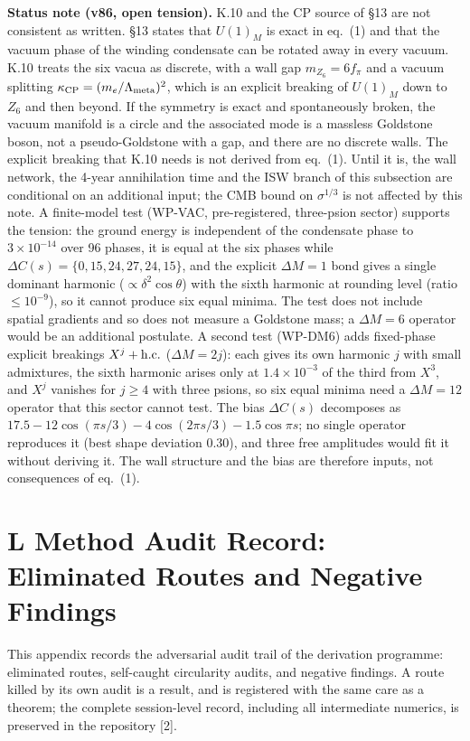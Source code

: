 \documentclass[11pt,letterpaper]{article}
\begin{document}
\noindent \textbf{Status note (v86, open tension).} K.10 and the CP source of §13 are not consistent as written. §13 states that $U(1)_M$ is exact in eq.~(1) and that the vacuum phase of the winding condensate can be rotated away in every vacuum. K.10 treats the six vacua as discrete, with a wall gap $m_{Z_6}=6f_\pi$ and a vacuum splitting $\kappa_{\rm CP}=(m_e/\Lambda_{\rm meta})^2$, which is an explicit breaking of $U(1)_M$ down to $Z_6$ and then beyond. If the symmetry is exact and spontaneously broken, the vacuum manifold is a circle and the associated mode is a massless Goldstone boson, not a pseudo-Goldstone with a gap, and there are no discrete walls. The explicit breaking that K.10 needs is not derived from eq.~(1). Until it is, the wall network, the 4-year annihilation time and the ISW branch of this subsection are conditional on an additional input; the CMB bound on $\sigma^{1/3}$ is not affected by this note. A finite-model test (WP-VAC, pre-registered, three-psion sector) supports the tension: the ground energy is independent of the condensate phase to $3\times10^{-14}$ over 96 phases, it is equal at the six phases while $\Delta C(s)=\{0,15,24,27,24,15\}$, and the explicit $\Delta M=1$ bond gives a single dominant harmonic ($\propto\delta^2\cos\theta$) with the sixth harmonic at rounding level (ratio $\le10^{-9}$), so it cannot produce six equal minima. The test does not include spatial gradients and so does not measure a Goldstone mass; a $\Delta M=6$ operator would be an additional postulate. A second test (WP-DM6) adds fixed-phase explicit breakings $X^j+{\rm h.c.}$ ($\Delta M=2j$): each gives its own harmonic $j$ with small admixtures, the sixth harmonic arises only at $1.4\times10^{-3}$ of the third from $X^3$, and $X^j$ vanishes for $j\ge4$ with three psions, so six equal minima need a $\Delta M=12$ operator that this sector cannot test. The bias $\Delta C(s)$ decomposes as $17.5-12\cos(\pi s/3)-4\cos(2\pi s/3)-1.5\cos\pi s$; no single operator reproduces it (best shape deviation 0.30), and three free amplitudes would fit it without deriving it. The wall structure and the bias are therefore inputs, not consequences of eq.~(1).

\clearpage
\section*{L  Method Audit Record: Eliminated Routes and Negative Findings}

\noindent This appendix records the adversarial audit trail of the derivation programme: eliminated routes, self-caught circularity audits, and negative findings. A route killed by its own audit is a result, and is registered with the same care as a theorem; the complete session-level record, including all intermediate numerics, is preserved in the repository [2].
\end{document}
